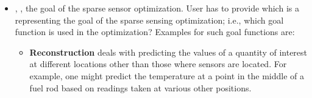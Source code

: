 \begin{itemize}
\item {}, , the goal of the sparse sensor optimization.
User has to provide  which is a  representing the goal of the sparse sensing optimization; i.e., which goal function is used in the optimization? Examples for such goal functions are:
\begin{itemize}
    \item \textbf{Reconstruction} deals with predicting the values of a quantity of interest at different locations other than those where sensors are located. For example, one might predict the temperature at a point in the middle of a fuel rod based on readings taken at various other positions.


\end{itemize}
\end{itemize}
